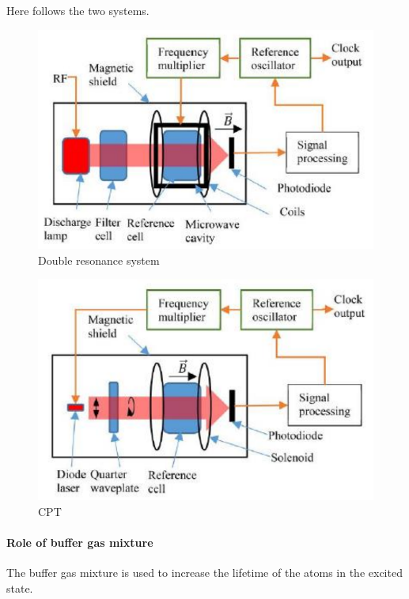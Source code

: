 Here follows the two systems.

\begin{figure}[H]
    \centering
    \includegraphics[width=\linewidth]{img/02.4-double-resonance-system.png}
    \caption{Double resonance system}
    \label{fig:double-resonance-system}
\end{figure}

\begin{figure}[H]
    \centering
    \includegraphics[width=\linewidth]{img/02.5-CPT.png}
    \caption{CPT}
    \label{fig:CPT}
\end{figure}


\paragraph{Role of buffer gas mixture}

The buffer gas mixture is used to increase the lifetime of the atoms in the excited state.